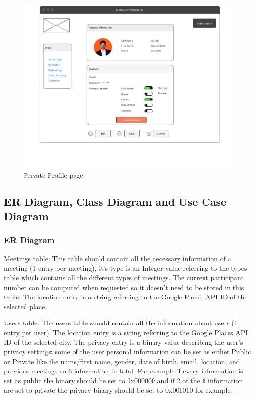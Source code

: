 \documentclass[conference]{IEEEtran}
\begin{document}
\begin{figure}
  \centering
  \includegraphics[scale=0.3]{pics/mockups/PrivateProfile.png}\quad
  \caption { Private Profile page}
\end{figure}

\clearpage

\subsection{ER Diagram, Class Diagram and Use Case Diagram}

\subsubsection{ER Diagram}

Meetings table:
This table should contain all the necessary information of a meeting (1 entry per meeting), it’s type is an Integer value referring to the types table which contains all the different types of meetings. The current participant number can be computed when requested so it doesn’t need to be stored in this table. The location entry is a string referring to the Google Places API ID of the selected place.

Users table:
The users table should contain all the information about users (1 entry per user). The location entry is a string referring to the Google Places API ID of the selected city. The privacy entry is a binary value describing the user’s privacy settings: some of the user personal information can be set as either Public or Private like the name/first name, gender, date of birth, email, location, and previous meetings so 6 information in total. For example if every information is set as public the binary should be set to 0x000000 and if 2 of the 6 information are set to private the privacy binary should be set to 0x001010 for example.
\end{document}
